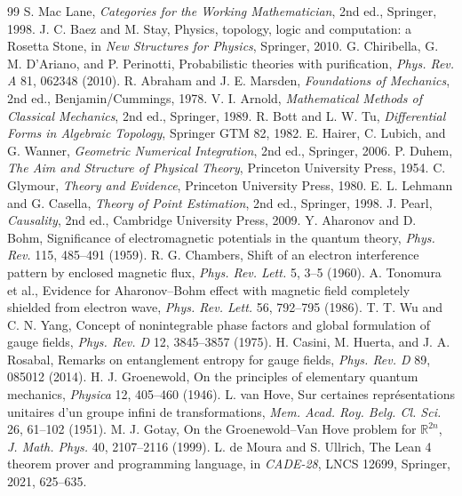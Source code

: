 \documentclass[11pt]{article}
\theoremstyle{definition}
\begin{document}
{\footnotesize
\begin{thebibliography}{99}
\itemsep0pt\parskip0pt
 S. Mac Lane, \emph{Categories for the Working Mathematician}, 2nd ed., Springer, 1998.
 J. C. Baez and M. Stay, Physics, topology, logic and computation: a Rosetta Stone, in \emph{New Structures for Physics}, Springer, 2010.
 G. Chiribella, G. M. D'Ariano, and P. Perinotti, Probabilistic theories with purification, \emph{Phys. Rev. A} 81, 062348 (2010).
 R. Abraham and J. E. Marsden, \emph{Foundations of Mechanics}, 2nd ed., Benjamin/Cummings, 1978.
 V. I. Arnold, \emph{Mathematical Methods of Classical Mechanics}, 2nd ed., Springer, 1989.
 R. Bott and L. W. Tu, \emph{Differential Forms in Algebraic Topology}, Springer GTM 82, 1982.
 E. Hairer, C. Lubich, and G. Wanner, \emph{Geometric Numerical Integration}, 2nd ed., Springer, 2006.
 P. Duhem, \emph{The Aim and Structure of Physical Theory}, Princeton University Press, 1954.
 C. Glymour, \emph{Theory and Evidence}, Princeton University Press, 1980.
 E. L. Lehmann and G. Casella, \emph{Theory of Point Estimation}, 2nd ed., Springer, 1998.
 J. Pearl, \emph{Causality}, 2nd ed., Cambridge University Press, 2009.
 Y. Aharonov and D. Bohm, Significance of electromagnetic potentials in the quantum theory, \emph{Phys. Rev.} 115, 485--491 (1959).
 R. G. Chambers, Shift of an electron interference pattern by enclosed magnetic flux, \emph{Phys. Rev. Lett.} 5, 3--5 (1960).
 A. Tonomura et al., Evidence for Aharonov--Bohm effect with magnetic field completely shielded from electron wave, \emph{Phys. Rev. Lett.} 56, 792--795 (1986).
 T. T. Wu and C. N. Yang, Concept of nonintegrable phase factors and global formulation of gauge fields, \emph{Phys. Rev. D} 12, 3845--3857 (1975).
 H. Casini, M. Huerta, and J. A. Rosabal, Remarks on entanglement entropy for gauge fields, \emph{Phys. Rev. D} 89, 085012 (2014).
 H. J. Groenewold, On the principles of elementary quantum mechanics, \emph{Physica} 12, 405--460 (1946).
 L. van Hove, Sur certaines repr\'esentations unitaires d'un groupe infini de transformations, \emph{Mem. Acad. Roy. Belg. Cl. Sci.} 26, 61--102 (1951).
 M. J. Gotay, On the Groenewold--Van Hove problem for $\mathbb R^{2n}$, \emph{J. Math. Phys.} 40, 2107--2116 (1999).
 L. de Moura and S. Ullrich, The Lean 4 theorem prover and programming language, in \emph{CADE-28}, LNCS 12699, Springer, 2021, 625--635.
\end{thebibliography}
}
\end{document}
